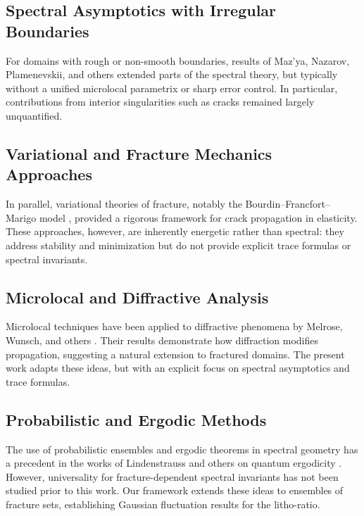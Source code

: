 \subsection*{Spectral Asymptotics with Irregular Boundaries}

For domains with rough or non-smooth boundaries, results of Maz'ya, Nazarov, 
Plamenevskii, and others \cite{MazyaNazarovPlamenevskii2000} extended parts of 
the spectral theory, but typically without a unified microlocal parametrix or 
sharp error control. In particular, contributions from interior singularities 
such as cracks remained largely unquantified.

\subsection*{Variational and Fracture Mechanics Approaches}

In parallel, variational theories of fracture, notably the 
Bourdin--Francfort--Marigo model \cite{BourdinFrancfortMarigo2000}, provided 
a rigorous framework for crack propagation in elasticity. These approaches, 
however, are inherently energetic rather than spectral: they address stability 
and minimization but do not provide explicit trace formulas or spectral 
invariants.

\subsection*{Microlocal and Diffractive Analysis}

Microlocal techniques have been applied to diffractive phenomena by 
Melrose, Wunsch, and others \cite{MelroseWunsch2004}. Their results demonstrate 
how diffraction modifies propagation, suggesting a natural extension to 
fractured domains. The present work adapts these ideas, but with an explicit 
focus on spectral asymptotics and trace formulas.

\subsection*{Probabilistic and Ergodic Methods}

The use of probabilistic ensembles and ergodic theorems in spectral geometry 
has a precedent in the works of Lindenstrauss and others on quantum ergodicity 
\cite{Lindenstrauss2006}. However, universality for fracture-dependent spectral 
invariants has not been studied prior to this work. Our framework extends these 
ideas to ensembles of fracture sets, establishing Gaussian fluctuation results 
for the litho-ratio.

